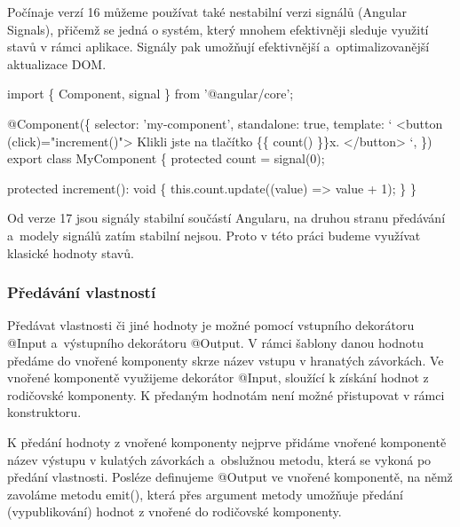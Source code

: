 Počínaje verzí 16 můžeme používat také nestabilní verzi signálů (Angular Signals), přičemž se jedná o systém, který mnohem efektivněji sleduje využití stavů v rámci aplikace. 
Signály pak umožňují efektivnější a~optimalizovanější aktualizace DOM. 

\begin{prog}
import \{ Component, signal \} from '@angular/core';

@Component(\{
  selector: 'my-component',
  standalone: true,
  template: `
    <button (click)="increment()">
      Klikli jste na tlačítko \{\{ count() \}\}x.
    </button>
  `,
\})
export class MyComponent \{
  protected count = signal(0);

  protected increment(): void \{
    this.count.update((value) => value + 1);
  \}
\}
\end{prog}

Od verze 17 jsou signály stabilní součástí Angularu, na druhou stranu předávání a~modely signálů zatím stabilní nejsou. 
Proto v této práci budeme využívat klasické hodnoty stavů.\cite{angulardev}

\subsubsection{Předávání vlastností}

Předávat vlastnosti či jiné hodnoty je možné pomocí vstupního dekorátoru @Input a~výstupního dekorátoru @Output. 
V rámci šablony danou hodnotu předáme do vnořené komponenty skrze název vstupu v hranatých závorkách.   
Ve vnořené komponentě využijeme dekorátor @Input, sloužící k získání hodnot z rodičovské komponenty. K předaným hodnotám není možné přistupovat v rámci konstruktoru. 

K předání hodnoty z vnořené komponenty nejprve přidáme vnořené komponentě název výstupu v kulatých závorkách a~obslužnou metodu, která se vykoná po předání vlastnosti. 
Posléze definujeme @Output ve vnořené komponentě, na němž zavoláme metodu emit(), která přes argument metody umožňuje předání (vypublikování) hodnot z vnořené do rodičovské komponenty.\cite{angulardev,learningangular}

